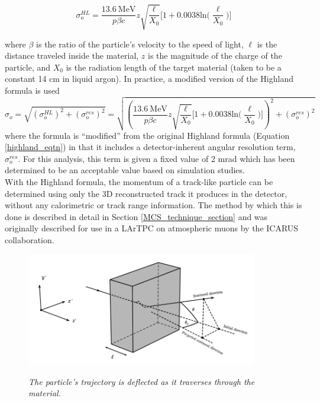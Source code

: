 \documentclass[a4paper,11pt]{article}
\begin{document}
\begin{equation}\label{highland_eqtn}
	\sigma_o^{HL}=\frac{13.6\  \text{MeV}}{p\beta c}z\sqrt{\frac{\ell}{X_0}}\Big[1+0.0038\text{ln}\Big(\frac{\ell}{X_0}\Big)\Big]
\end{equation}

\noindent where $\beta$ is the ratio of the particle's velocity to the speed of light, $\ell$ is the distance traveled inside the material, $z$ is the magnitude of the charge of the particle, and $X_0$ is the radiation length of the target material (taken to be a constant 14 cm in liquid argon). In practice, a modified version of the Highland formula is used
\begin{equation}\label{modified_highland_eqtn}
\sigma_{o} = \sqrt{ (\sigma_o^{HL})^2 + (\sigma_o^{res})^2} = \sqrt{ (\frac{13.6\  \text{MeV}}{p\beta c}z\sqrt{\frac{\ell}{X_0}}\Big[1+0.0038\text{ln}\Big(\frac{\ell}{X_0}\Big)\Big])^2 + (\sigma_o^{res})^2 }
\end{equation}
where the formula is ``modified'' from the original Highland formula (Equation \ref{highland_eqtn}) in that it includes a detector-inherent angular resolution term, $\sigma_o^{res}$. For this analysis, this term is given a fixed value of 2 mrad which has been determined to be an acceptable value based on simulation studies.\\


With the Highland formula, the momentum of a track-like particle can be determined using only the 3D reconstructed track it produces in the detector, without any calorimetric or track range information. The method by which this is done is described in detail in Section \ref{MCS_technique_section} and was originally described for use in a LArTPC on atmospheric muons by the ICARUS collaboration\cite{icarus_mcs_paper}.

\begin{figure}[ht!]
\centering
	\includegraphics[width=0.9\textwidth]{Figures/static_figs/mcs_nocap.png} \\
\caption{\textit{The particle's trajectory is deflected as it traverses through the material.}}\label{mcs_nocap_fig}
\end{figure}
\end{document}
